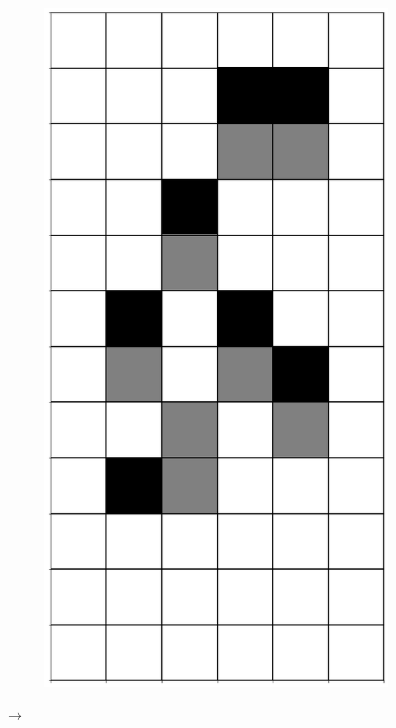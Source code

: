 \documentclass[12pt]{article}
\numberwithin{figure}{section} %
\begin{document}
\begin{figure}[H]
        \begin{subfigure}{0.3\textwidth}
     \centering
     \includegraphics[angle=270,width=\linewidth]{Section4/5.2}
     \subcaption{}
   \end{subfigure}
      {\LARGE$\xrightarrow{}$}
      \newline

\end{figure}
\end{document}
